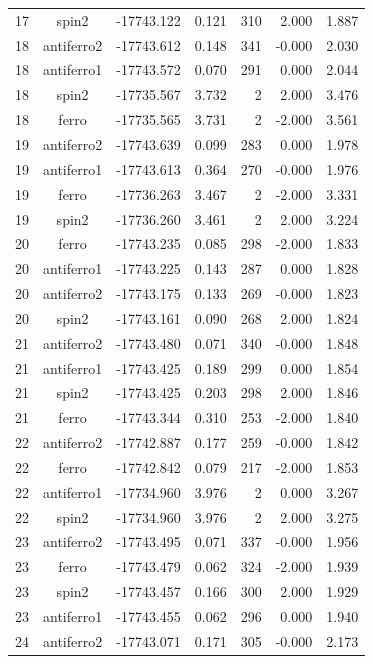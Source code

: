 \begin{longtable}{@{}ccrrrrr@{}}
17 & spin2 & -17743.122 & 0.121 & 310 & 2.000 & 1.887 \\
\rowcolor{gray!20} 18 & antiferro2 & -17743.612 & 0.148 & 341 & -0.000 & 2.030 \\
18 & antiferro1 & -17743.572 & 0.070 & 291 & 0.000 & 2.044 \\
18 & spin2 & -17735.567 & 3.732 & 2 & 2.000 & 3.476 \\
18 & ferro & -17735.565 & 3.731 & 2 & -2.000 & 3.561 \\
\rowcolor{gray!20} 19 & antiferro2 & -17743.639 & 0.099 & 283 & 0.000 & 1.978 \\
19 & antiferro1 & -17743.613 & 0.364 & 270 & -0.000 & 1.976 \\
19 & ferro & -17736.263 & 3.467 & 2 & -2.000 & 3.331 \\
19 & spin2 & -17736.260 & 3.461 & 2 & 2.000 & 3.224 \\
\rowcolor{gray!20} 20 & ferro & -17743.235 & 0.085 & 298 & -2.000 & 1.833 \\
20 & antiferro1 & -17743.225 & 0.143 & 287 & 0.000 & 1.828 \\
20 & antiferro2 & -17743.175 & 0.133 & 269 & -0.000 & 1.823 \\
20 & spin2 & -17743.161 & 0.090 & 268 & 2.000 & 1.824 \\
\rowcolor{gray!20} 21 & antiferro2 & -17743.480 & 0.071 & 340 & -0.000 & 1.848 \\
21 & antiferro1 & -17743.425 & 0.189 & 299 & 0.000 & 1.854 \\
21 & spin2 & -17743.425 & 0.203 & 298 & 2.000 & 1.846 \\
21 & ferro & -17743.344 & 0.310 & 253 & -2.000 & 1.840 \\
\rowcolor{gray!20} 22 & antiferro2 & -17742.887 & 0.177 & 259 & -0.000 & 1.842 \\
22 & ferro & -17742.842 & 0.079 & 217 & -2.000 & 1.853 \\
22 & antiferro1 & -17734.960 & 3.976 & 2 & 0.000 & 3.267 \\
22 & spin2 & -17734.960 & 3.976 & 2 & 2.000 & 3.275 \\
\rowcolor{gray!20} 23 & antiferro2 & -17743.495 & 0.071 & 337 & -0.000 & 1.956 \\
23 & ferro & -17743.479 & 0.062 & 324 & -2.000 & 1.939 \\
23 & spin2 & -17743.457 & 0.166 & 300 & 2.000 & 1.929 \\
23 & antiferro1 & -17743.455 & 0.062 & 296 & 0.000 & 1.940 \\
\rowcolor{gray!20} 24 & antiferro2 & -17743.071 & 0.171 & 305 & -0.000 & 2.173 \\

\end{longtable}
